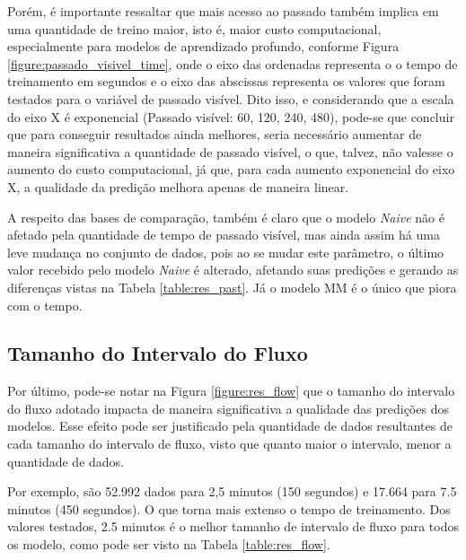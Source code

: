 Porém, é importante ressaltar que mais acesso ao passado também implica em uma quantidade de treino maior, isto é, maior custo computacional, especialmente para modelos de aprendizado profundo, conforme  Figura \ref{figure:passado_visivel_time}, onde o eixo das ordenadas representa o o tempo de treinamento em segundos e o eixo das abscissas representa os valores que foram testados para o variável de passado visível. Dito isso, e considerando que a escala do eixo X é exponencial (Passado visível: 60, 120, 240, 480), pode-se que concluir que para conseguir resultados ainda melhores, seria necessário aumentar de maneira significativa a quantidade de passado visível, o que, talvez, não valesse o aumento do custo computacional, já que, para cada aumento exponencial do eixo X, a qualidade da predição melhora apenas de maneira linear. 

A respeito das bases de comparação, também é claro que o modelo \textit{Naive} não é afetado pela quantidade de tempo de passado visível, mas ainda assim há uma leve mudança no conjunto de dados, pois ao se mudar este parâmetro, o último valor recebido pelo modelo \textit{Naive} é alterado, afetando suas predições e gerando as diferenças vistas na Tabela \ref{table:res_past}. Já o modelo \acrshort{MM} é o único que piora com o tempo. 
\subsection{Tamanho do Intervalo do Fluxo}

Por último, pode-se notar na Figura \ref{figure:res_flow} que o tamanho do intervalo do fluxo adotado impacta de maneira significativa a qualidade das predições dos modelos. Esse efeito pode ser justificado pela quantidade de dados resultantes de cada tamanho do intervalo de fluxo, visto que quanto maior o intervalo, menor a quantidade de dados. 

Por exemplo, são 52.992 dados para 2,5 minutos (150 segundos) e 17.664 para 7.5 minutos (450 segundos). O que torna mais extenso o tempo de treinamento. Dos valores testados, 2.5 minutos é o melhor tamanho de intervalo de fluxo para todos os modelo, como pode ser visto na Tabela \ref{table:res_flow}.

